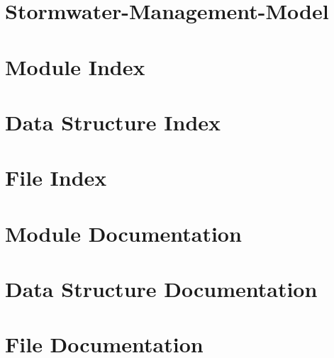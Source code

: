 \documentclass[twoside]{book}
\newcommand{\+}{\discretionary{\mbox{\scriptsize$\hookleftarrow$}}{}{}}
\newcommand{\clearemptydoublepage}{%
  \newpage{\pagestyle{empty}\cleardoublepage}%
}
\begin{document}
\chapter{Stormwater-\/\+Management-\/\+Model}
\label{md__c_1__p_r_o_j_e_c_t_c_o_d_e__stormwater-_management-_model__r_e_a_d_m_e}

\chapter{Module Index}

\chapter{Data Structure Index}

\chapter{File Index}

\chapter{Module Documentation}





\chapter{Data Structure Documentation}








\chapter{File Documentation}



\backmatter
\newpage
{}
\clearemptydoublepage
{}
\printindex
\end{document}
